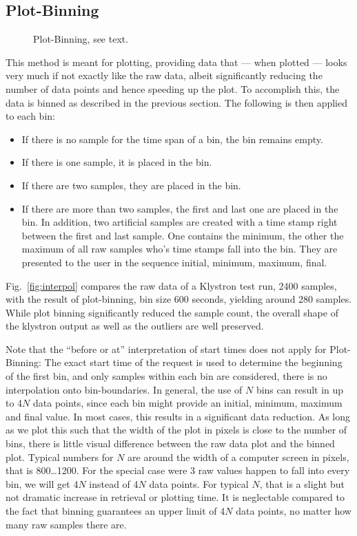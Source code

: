 \subsection{Plot-Binning} \label{sec:plotbinning}
\begin{figure}[htb]
\begin{center}
\medskip
{}
\end{center}
\caption{\label{fig:plotbin}Plot-Binning, see text.}
\end{figure}

This method is meant for plotting, providing data that --- when
plotted --- looks very much if not exactly like the raw data, albeit
significantly reducing the number of data points and hence speeding up
the plot.  To accomplish this, the data is binned as described in the
previous section. The following is then applied to each bin:
\begin{itemize}
\item If there is no sample for the time span of a bin, the bin
  remains empty.
\item If there is one sample, it is placed in the bin.
\item If there are two samples, they are placed in the bin.
\item If there are more than two samples, the first and last one
  are placed in the bin. In addition, two artificial samples are
  created with a time stamp right between the first and last sample.
  One contains the minimum, the other the maximum of all raw samples
  who's time stamps fall into the bin. They are presented to the user
  in the sequence initial, minimum, maximum, final.
\end{itemize}

\noindent Fig.~\ref{fig:interpol} compares the raw data of a Klystron
test run, 2400 samples, with the result of plot-binning, bin size 600
seconds, yielding around 280 samples. While plot binning significantly
reduced the sample count, the overall shape of the klystron output as
well as the outliers are well preserved.

Note that the ``before or at'' interpretation of start times does not
apply for Plot-Binning: The exact start time of the request is used to
determine the beginning of the first bin, and only samples within each
bin are considered, there is no interpolation onto bin-boundaries.  In
general, the use of $N$ bins can result in up to 4$N$ data points,
since each bin might provide an initial, minimum, maximum and final
value.  In most cases, this results in a significant data
reduction. As long as we plot this such that the width of the plot in
pixels is close to the number of bins, there is little visual
difference between the raw data plot and the binned plot.  Typical
numbers for $N$ are around the width of a computer screen in pixels,
that is 800\ldots 1200.  For the special case were 3 raw values happen
to fall into every bin, we will get 4$N$ instead of 4$N$ data
points. For typical $N$, that is a slight but not dramatic increase in
retrieval or plotting time. It is neglectable compared to the fact
that binning guarantees an upper limit of 4$N$ data points, no matter
how many raw
samples there are.
